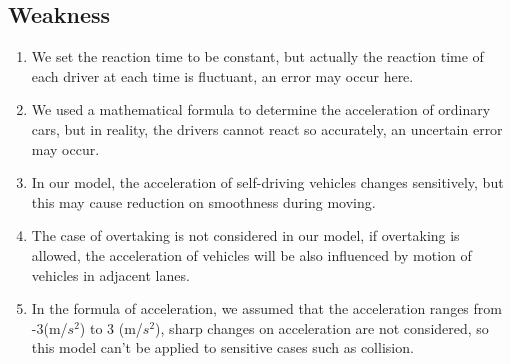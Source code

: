 \documentclass{icmmcm}
\begin{document}
\subsection{Weakness}
\begin{enumerate}
\item We set the reaction time to be constant, but actually the reaction time of each driver at each time is fluctuant, an error may occur here.
\item We used a mathematical formula to determine the acceleration of ordinary cars, but in reality, the drivers cannot react so accurately, an uncertain error may occur.
\item In our model, the acceleration of self-driving vehicles changes sensitively, but this may cause reduction on smoothness during moving.
\item The case of overtaking is not considered in our model, if overtaking is allowed, the acceleration of vehicles will be also influenced by motion of vehicles in adjacent lanes. 
\item In the formula of acceleration, we assumed that the acceleration ranges from -3(m/$s^{2}$) to 3 (m/$s^{2}$), sharp changes on acceleration are not considered, so this model can't be applied to sensitive cases such as collision.
\end{enumerate}







\end{document}
